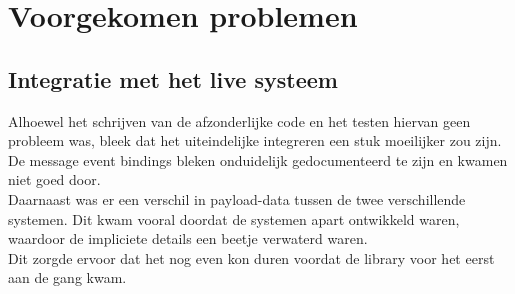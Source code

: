 \section{Voorgekomen problemen}

\subsection{Integratie met het live systeem}

Alhoewel het schrijven van de afzonderlijke code en het testen hiervan geen probleem was, bleek dat het uiteindelijke integreren een stuk moeilijker zou zijn. De message event bindings bleken onduidelijk gedocumenteerd te zijn en kwamen niet goed door. \\

Daarnaast was er een verschil in payload-data tussen de twee verschillende systemen. Dit kwam vooral doordat de systemen apart ontwikkeld waren, waardoor de impliciete details een beetje verwaterd waren. \\

Dit zorgde ervoor dat het nog even kon duren voordat de library voor het eerst aan de gang kwam.



	